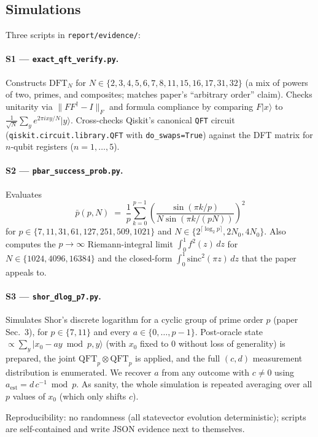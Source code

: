 \documentclass[11pt]{article}
\begin{document}
\subsection{Simulations}
Three scripts in \texttt{report/evidence/}:

\paragraph{S1 --- \texttt{exact\_qft\_verify.py}.}
Constructs $\text{DFT}_N$ for
$N \in \{2,3,4,5,6,7,8,11,15,16,17,31,32\}$ (a mix of powers of two, primes, and
composites; matches paper's ``arbitrary order'' claim).  Checks unitarity via
$\|F F^\dagger - I\|_F$ and formula compliance by comparing
$F |x\rangle$ to $\frac{1}{\sqrt N} \sum_y e^{2\pi i x y / N} |y\rangle$.
Cross-checks Qiskit's canonical \texttt{QFT} circuit
(\texttt{qiskit.circuit.library.QFT} with \texttt{do\_swaps=True}) against the
DFT matrix for $n$-qubit registers ($n=1,\dots,5$).

\paragraph{S2 --- \texttt{pbar\_success\_prob.py}.}
Evaluates
\[
  \bar p(p, N) \;=\; \frac{1}{p} \sum_{k=0}^{p-1}
     \left(\frac{\sin(\pi k / p)}{N \sin(\pi k / (pN))}\right)^{\!2}
\]
for $p \in \{7, 11, 31, 61, 127, 251, 509, 1021\}$ and
$N \in \{2^{\lceil \log_2 p\rceil}, 2 N_0, 4 N_0\}$.  Also computes the
$p \to \infty$ Riemann-integral limit
$\int_0^1 f^2(z) \, dz$ for $N \in \{1024, 4096, 16384\}$ and the closed-form
$\int_0^1 \text{sinc}^2(\pi z) \, dz$ that the paper appeals to.

\paragraph{S3 --- \texttt{shor\_dlog\_p7.py}.}
Simulates Shor's discrete logarithm for a cyclic group of prime order $p$
(paper Sec.~3), for $p \in \{7, 11\}$ and every $a \in \{0,\dots,p-1\}$.
Post-oracle state $\propto \sum_y |x_0 - a y \bmod p, y\rangle$
(with $x_0$ fixed to 0 without loss of generality) is prepared, the joint
$\text{QFT}_p \otimes \text{QFT}_p$ is applied, and the full
$(c, d)$ measurement distribution is enumerated.  We recover
$a$ from any outcome with $c \ne 0$ using
$a_{\mathrm{est}} = d\, c^{-1} \bmod p$.  As sanity, the whole simulation is
repeated averaging over all $p$ values of $x_0$ (which only shifts $c$).

Reproducibility: no randomness (all statevector evolution deterministic); scripts
are self-contained and write JSON evidence next to themselves.
\end{document}
